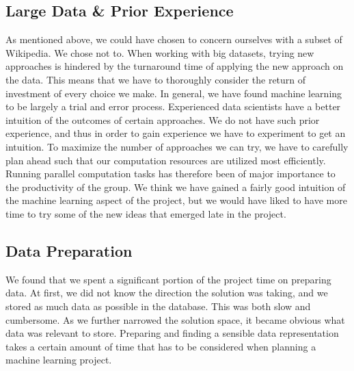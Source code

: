 \subsection{Large Data \& Prior Experience}
As mentioned above, we could have chosen to concern ourselves with a subset of Wikipedia. We chose not to. When working with big datasets, trying new approaches is hindered by the turnaround time of applying the new approach on the data. This means that we have to thoroughly consider the return of investment of every choice we make. In general, we have found machine learning to be largely a trial and error process. Experienced data scientists have a better intuition of the outcomes of certain approaches. We do not have such prior experience, and thus in order to gain experience we have to experiment to get an intuition. To maximize the number of approaches we can try, we have to carefully plan ahead such that our computation resources are utilized most efficiently. Running parallel computation tasks has therefore been of major importance to the productivity of the group. We think we have gained a fairly good intuition of the machine learning aspect of the project, but we would have liked to have more time to try some of the new ideas that emerged late in the project. 

\subsection{Data Preparation}
We found that we spent a significant portion of the project time on preparing data. At first, we did not know the direction the solution was taking, and we stored as much data as possible in the database. This was both slow and cumbersome. As we further narrowed the solution space, it became obvious what data was relevant to store. Preparing and finding a sensible data representation takes a certain amount of time that has to be considered when planning a machine learning project.

